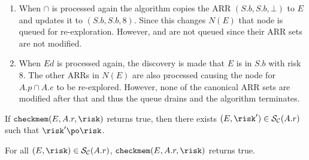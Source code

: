 \begin{enumerate}
\item When  $\cap$  is
  processed again the algorithm copies the ARR $(S.b, S.b, \bot)$ to $E$
  and updates it to $(S.b, S.b, 8)$. Since this changes $N(E)$ that node
  is queued for re-exploration. However,  and
   are not queued since their ARR sets are not
  modified.

\item When $\mathit{Ed}$ is processed again, the discovery is made that
  $E$ is in $S.b$ with risk 8. The other ARRs in $N(E)$ are also
  processed causing the node for $A.p \cap A.e$ to be re-explored.
  However, none of the canonical ARR sets are modified after that and
  thus the queue drains and the algorithm terminates.
\end{enumerate}

\begin{theorem}
If $\mbox{\texttt{checkmem}}(E, A.r, \risk)$ returns true, then there
exists $(E, \risk') \in \mathcal{S}_\mathcal{C}(A.r)$ such that $\risk'
\po \risk$.
\end{theorem}

\begin{theorem}
For all $(E, \risk) \in \mathcal{S}_\mathcal{C}(A.r)$,
$\mbox{\texttt{checkmem}}(E, A.r, \risk)$ returns true.
\end{theorem}

